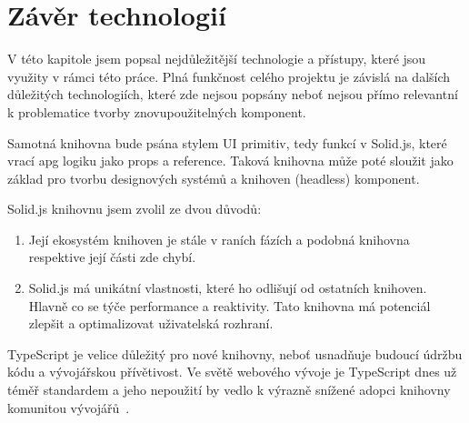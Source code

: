 \clearpage

\section{Závěr technologií}

V této kapitole jsem popsal nejdůležitější technologie a přístupy, které jsou využity v rámci této práce.
Plná funkčnost celého projektu je závislá na dalších důležitých technologiích, které zde nejsou popsány neboť nejsou přímo relevantní k problematice tvorby znovupoužitelných komponent.

Samotná knihovna bude psána stylem UI primitiv, tedy funkcí v Solid.js, které vrací \gls{apg} logiku jako props a reference.
Taková knihovna může poté sloužit jako základ pro tvorbu designových systémů a knihoven (headless) komponent.

Solid.js knihovnu jsem zvolil ze dvou důvodů:

\begin{enumerate}
      \item Její ekosystém knihoven je stále v raních fázích a podobná knihovna respektive její části zde chybí.
      \item Solid.js má unikátní vlastnosti, které ho odlišují od ostatních knihoven.
            Hlavně co se týče performance a reaktivity.
            Tato knihovna má potenciál zlepšit a optimalizovat uživatelská rozhraní.
\end{enumerate}

TypeScript je velice důležitý pro nové knihovny, neboť usnadňuje budoucí údržbu kódu a vývojářskou přívětivost.
Ve světě webového vývoje je TypeScript dnes už téměř standardem a jeho nepoužití by vedlo k výrazně snížené adopci knihovny komunitou vývojářů~\cite{stateofjs-2022}.

